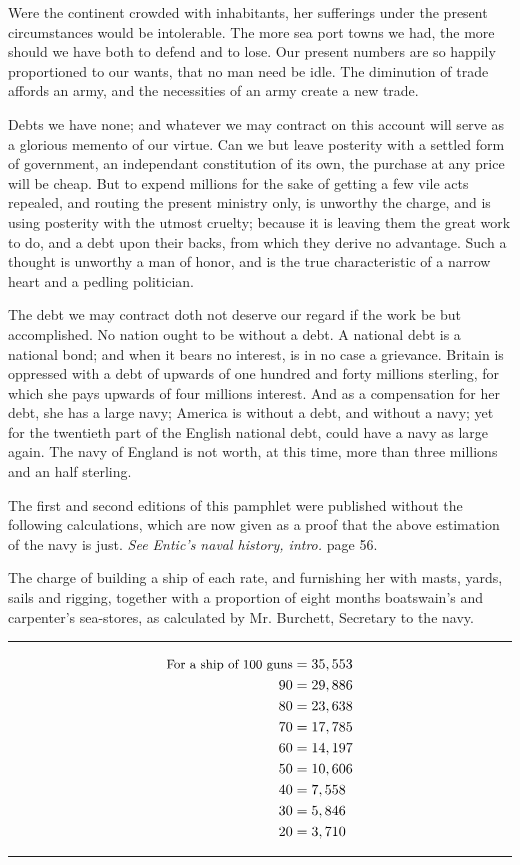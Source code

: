 \documentclass[12pt, twocolumn]{book}
\begin{document}
    Were the continent crowded with inhabitants, her sufferings under the present circumstances would be intolerable. The more sea port towns we had, the more should we have both to defend and to lose. Our present numbers are so happily proportioned to our wants, that no man need be idle. The diminution of trade affords an army, and the necessities of an army create a new trade.

    Debts we have none; and whatever we may contract on this account will serve as a glorious memento of our virtue. Can we but leave posterity with a settled form of government, an independant constitution of its own, the purchase at any price will be cheap. But to expend millions for the sake of getting a few vile acts repealed, and routing the present ministry only, is unworthy the charge, and is using posterity with the utmost cruelty; because it is leaving them the great work to do, and a debt upon their backs, from which they derive no advantage. Such a thought is unworthy a man of honor, and is the true characteristic of a narrow heart and a pedling politician.

    The debt we may contract doth not deserve our regard if the work be but accomplished. No nation ought to be without a debt. A national debt is a national bond; and when it bears no interest, is in no case a grievance. Britain is oppressed with a debt of upwards of one hundred and forty millions sterling, for which she pays upwards of four millions interest. And as a compensation for her debt, she has a large navy; America is without a debt, and without a navy; yet for the twentieth part of the English national debt, could have a navy as large again. The navy of England is not worth, at this time, more than three millions and an half sterling.

    The first and second editions of this pamphlet were published without the following calculations, which are now given as a proof that the above estimation of the navy is just. \textit{See Entic’s naval history, intro.} page 56.

    The charge of building a ship of each rate, and furnishing her with masts, yards, sails and rigging, together with a proportion of eight months boatswain’s and carpenter’s sea-stores, as calculated by Mr. Burchett, Secretary to the navy.

    \medskip

    \noindent \rule{\columnwidth}{2pt}
    \begin{equation}
        \begin{split}
        \text{\small For a ship of 100 guns} & = 35,553 \\
        90 & = 29, 886 \\
        80 & = 23, 638 \\
        70 & = 17, 785 \\
        60 & = 14, 197 \\
        50 & = 10, 606 \\
        40 & = 7, 558 \\
        30 & = 5, 846 \\
        20 & = 3, 710
        \end{split}
    \end{equation}
    \noindent \rule{\columnwidth}{2pt}
\end{document}
